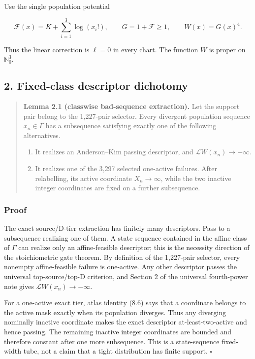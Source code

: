 Use the single population potential

\[
 \mathcal F(x)=K+\sum_{i=1}^3\log(x_i!),
 \qquad G=1+\mathcal F\ge1,
 \qquad W(x)=G(x)^4.                                \tag{1.1}
\]

Thus the linear correction is \(\ell=0\) in every chart. The function
\(W\) is proper on \(\mathbb N_0^3\).

\subsection{2. Fixed-class descriptor
dichotomy}

\begin{quote}
\textbf{Lemma 2.1 (classwise bad-sequence extraction).} Let the support
pair belong to the 1,227-pair selector. Every divergent population
sequence \(x_n\in\Gamma\) has a subsequence satisfying exactly one of
the following alternatives.

\begin{enumerate}
\def\labelenumi{\arabic{enumi}.}
\tightlist
\item
  It realizes an Anderson--Kim passing descriptor, and
  \(\mathcal L W(x_n)\to-\infty\).
\item
  It realizes one of the 3,297 selected one-active failures. After
  relabelling, its active coordinate \(X_n\to\infty\), while the two
  inactive integer coordinates are fixed on a further subsequence.
\end{enumerate}
\end{quote}

\subsubsection{Proof}

The exact source/D-tier extraction has finitely many descriptors. Pass
to a subsequence realizing one of them. A state sequence contained in
the affine class of \(\Gamma\) can realize only an affine-feasible
descriptor; this is the necessity direction of the stoichiometric gate
theorem. By definition of the 1,227-pair selector, every nonempty
affine-feasible failure is one-active. Any other descriptor passes the
universal top-source/top-D criterion, and Section 2 of the universal
fourth-power note gives \(\mathcal L W(x_n)\to-\infty\).

For a one-active exact tier, atlas identity (8.6) says that a coordinate
belongs to the active mask exactly when its population diverges. Thus
any diverging nominally inactive coordinate makes the exact descriptor
at-least-two-active and hence passing. The remaining inactive integer
coordinates are bounded and therefore constant after one more
subsequence. This is a state-sequence fixed-width tube, not a claim that
a tight distribution has finite support. \(\square\)

